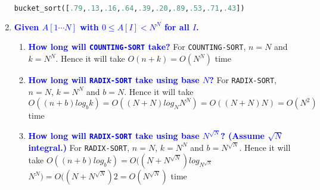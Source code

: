 \documentclass{article}
\begin{document}
\begin{enumerate}
\begin{lstlisting}[language=Python]
    bucket_sort([.79,.13,.16,.64,.39,.20,.89,.53,.71,.43])
    \end{lstlisting}

\item \textbf{\textcolor{blue}{Given $A[1\cdots N]$ with $0\leq A[I]<N^N$ for all $I$.}}
    \begin{enumerate}
    \item \textbf{\textcolor{blue}{How long will {\tt COUNTING-SORT} take?}}
        \newline For {\tt COUNTING-SORT}, $n=N$ and $k=N^N$. Hence it will take $O(n+k)=O(N^N)$ time
    \item \textbf{\textcolor{blue}{How long will {\tt RADIX-SORT} take using base $N$?}}
        \newline For {\tt RADIX-SORT}, $n=N$, $k=N^N$ and $b=N$. Hence it will take $O((n+b)log_b k)=O((N+N)log_N N^N)=O((N+N)N)=O(N^2)$ time
    \item \textbf{\textcolor{blue}{How long will {\tt RADIX-SORT} take using base $N^{\sqrt{N}}$?
    (Assume $\sqrt{N}$ integral.)}}
        \newline For {\tt RADIX-SORT}, $n=N$, $k=N^N$ and $b=N^\sqrt{N}$. Hence it will take $O((n+b)log_b k)=O((N+N^{\sqrt{N}}) log_{N^\sqrt{N}}$ $N^N)=O((N+N^{\sqrt{N}})2=O(N^{\sqrt{N}})$ time
    \end{enumerate}
    

\end{enumerate}
\end{document}
